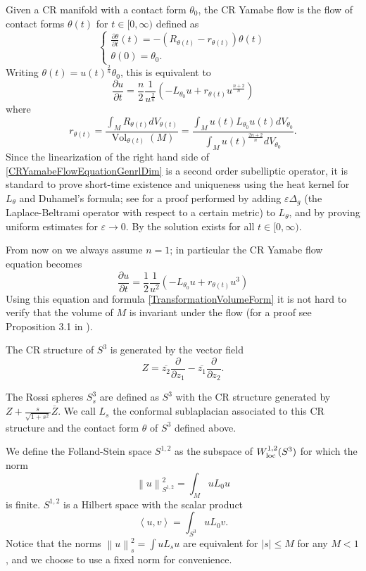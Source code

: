 \documentclass[a4paper,12pt]{amsart}
\newcommand{\de}{\partial}
\newcommand{\rosso}[1]{{\color{red}#1}}
\newcommand{\N}[1]{\left\lVert#1\right\rVert}
\newcommand{\bra}{\left\langle}
\newcommand{\ket}{\right\rangle}
\newcommand{\e}{\varepsilon}
\DeclareMathOperator{\Vol}{Vol}
\begin{document}
Given a CR manifold with a contact form $\theta_0$, the CR Yamabe flow is the flow of contact forms $\theta(t)$ for $t\in[0,\infty)$ defined as
$$\left\{\begin{matrix}
    \frac{\de\theta}{\de t}(t) = -(R_{\theta(t)}-r_{\theta(t)})\theta(t)\\
    \theta(0)=\theta_0.
\end{matrix}\right.$$
Writing $\theta(t)=u(t)^{\frac{2}{n}}\theta_0$, this is equivalent to
\begin{equation}\label{CRYamabeFlowEquationGenrlDim}
 \frac{\de u}{\de t} = \frac{n}{2}\frac{1}{u^{\frac{2}{n}}}\left(-L_{\theta_0}u +r_{\theta(t)}u^{\frac{n+2}{n}} \right)
\end{equation}
where
$$r_{\theta(t)}=\frac{\int_MR_{\theta(t)}dV_{\theta(t)}}{\Vol_{\theta(t)}(M)} = \frac{\int_Mu(t)L_{\theta_0}u(t)dV_{\theta_0}}{\int_Mu(t)^{\frac{2n+2}{n}}dV_{\theta_0}}.$$
Since the linearization of the right hand side of \eqref{CRYamabeFlowEquationGenrlDim} is a second order subelliptic operator, it is standard to prove short-time existence and uniqueness using the heat kernel for $L_{\theta}$ and Duhamel's formula; see \cite{Z} for a proof performed by adding $\e\Delta_{g}$ (the Laplace-Beltrami operator with respect to a certain metric) to $L_{\theta}$, and by proving uniform estimates for $\e\to 0$. By \cite{H-LTexistence} the solution exists for all $t\in[0,\infty)$.

From now on we always assume $n=1$; in particular the CR Yamabe flow equation becomes
\begin{equation}\label{CRYamabeFlowEquation}
 \frac{\de u}{\de t} = \frac{1}{2}\frac{1}{u^2}\left(-L_{\theta_0}u +r_{\theta(t)}u^3 \right)
\end{equation}
Using this equation and formula \eqref{TransformationVolumeForm} it is not hard to verify that the volume of $M$ is invariant under the flow (for a proof see Proposition 3.1 in \cite{H-LTexistence}).

The CR structure of $S^3$ is generated by the vector field
$$Z= \overline{z_2}\frac{\de}{\de z_1} - \overline{z_1}\frac{\de}{\de z_2}.$$

The Rossi spheres $S^3_s$ are defined as $S^3$ with the CR structure generated by $Z+\frac{s}{\sqrt{1+s^2}}\overline{Z}$.
We call $L_s$ the conformal sublaplacian associated to this CR structure and the contact form $\theta$ of $S^3$ defined above.

We define the Folland-Stein space $S^{1,2}$ %
as the subspace of $W^{1,2}_{\rm{loc}}(S^3)$ for which the norm
$$\N{u}_{S^{1,2}}^2 = \int_MuL_0u$$
is finite. $S^{1,2}$ is a Hilbert space with the scalar product
$$\bra u,v\ket = \int_{S^3}uL_0v.$$
Notice that the norms $\N{u}_s^2 = \int uL_su$ are equivalent for $|s|\le M$ for any $M<1$, and we choose to use a fixed norm for convenience.
\end{document}
